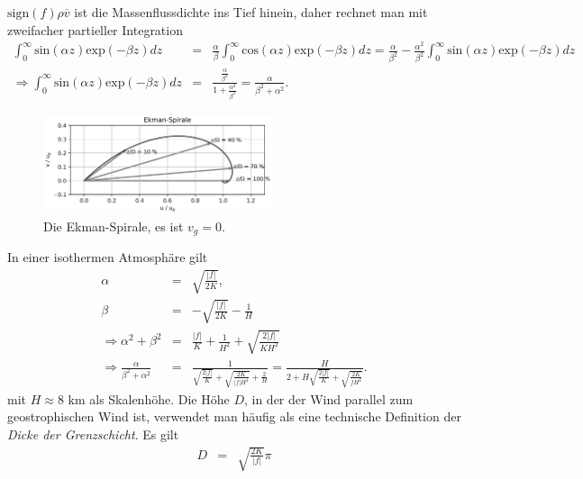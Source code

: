 \documentclass{book}
\newcommand\newoverline[1]{%
\overline{#1}}
\renewcommand{\exp}{\text{exp}}
\renewcommand{\sin}{\text{sin}}
\renewcommand{\cos}{\text{cos}}
\newcommand{\sign}{\text{sign}}
\begin{document}
%
$\sign\left(f\right)\rho\newoverline{v}$ ist die Massenflussdichte ins Tief hinein, daher rechnet man mit zweifacher partieller Integration
%
\begin{eqnarray}
\int_0^\infty\sin\left(\alpha z\right)\exp\left(-\beta z\right)dz & = & \frac{\alpha}{\beta}\int_0^\infty\cos\left(\alpha z\right)\exp\left(-\beta z\right)dz = \frac{\alpha}{\beta^2} - \frac{\alpha^2}{\beta^2}\int_0^\infty\sin\left(\alpha z\right)\exp\left(-\beta z\right)dz\nonumber\\
\Rightarrow\int_0^\infty\sin\left(\alpha z\right)\exp\left(-\beta z\right)dz & = & \frac{\frac{\alpha}{\beta^2}}{1 + \frac{\alpha^2}{\beta^2}} = \frac{\alpha}{\beta^2 + \alpha^2}.
\end{eqnarray}
%
\begin{figure}
\begin{center}
\includegraphics[width = 0.6\textwidth]{figs/ekman_spiral.png}
\caption{Die Ekman-Spirale, es ist $v_g = 0$.}
\label{fig:ekman_spiral}
\end{center}
\end{figure}
%
In einer isothermen Atmosphäre gilt
%
\begin{eqnarray}
\alpha & = & \sqrt{\frac{\left|f\right|}{2K}},\\
\beta & = & -\sqrt{\frac{\left|f\right|}{2K}} - \frac{1}{H}\\
\Rightarrow \alpha^2 + \beta^2 & = & \frac{\left|f\right|}{K} + \frac{1}{H^2} + \sqrt{\frac{2\left|f\right|}{KH^2}}\\
\Rightarrow \frac{\alpha}{\beta^2 + \alpha^2} & = & \frac{1}{\sqrt{\frac{2\left|f\right|}{K}} + \sqrt{\frac{2K}{\left|f\right|H^4}} + \frac{2}{H}} = \frac{H}{2 + H\sqrt{\frac{2\left|f\right|}{K}} + \sqrt{\frac{2K}{fH^2}}}.
\end{eqnarray}
%
mit $H \approx 8$ km als Skalenhöhe. Die Höhe $D$, in der der Wind parallel zum geostrophischen Wind ist, verwendet man häufig als eine technische Definition der \textit{Dicke der Grenzschicht}. Es gilt
%
\begin{eqnarray}
D & = & \sqrt{\frac{2K}{\left|f\right|}}\pi
\end{eqnarray}
\end{document}
